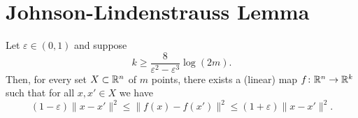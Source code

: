 \section{Johnson-Lindenstrauss Lemma}
\begin{boxtheorem}
    Let $\varepsilon\in(0,1)$ and suppose 
    $$
    k\geq \frac{8}{\varepsilon^2-\varepsilon^3}\log(2m)
    .$$
    Then, for every set $X\subset \mathbb{R}^n$ of $m$ points,
    there exists a (linear) map $f\colon \mathbb{R}^n\to \mathbb{R}^k$ such
    that for all $x,x'\in X$ we have
    $$
    (1-\varepsilon)\|x-x'\|^2\leq
    \|f(x)-f(x')\|^2\leq
    (1+\varepsilon)\|x-x'\|^2.
    $$
\end{boxtheorem}

